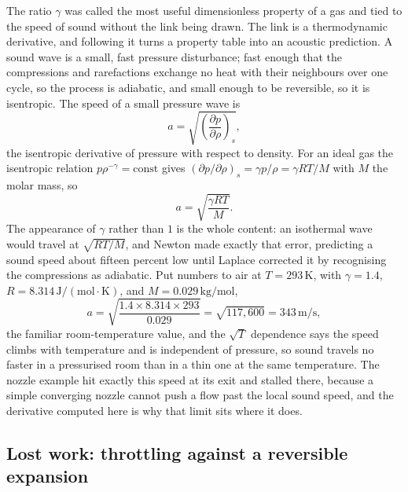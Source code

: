 The ratio $\gamma$ was called the most useful dimensionless property of a gas and
tied to the speed of sound without the link being drawn. The link is a
thermodynamic derivative, and following it turns a property table into an acoustic
prediction. A sound wave is a small, fast pressure disturbance; fast enough that
the compressions and rarefactions exchange no heat with their neighbours over one
cycle, so the process is adiabatic, and small enough to be reversible, so it is
isentropic. The speed of a small pressure wave is
\[
a = \sqrt{\left(\frac{\partial p}{\partial \rho}\right)_s},
\]
the isentropic derivative of pressure with respect to density. For an ideal gas the
isentropic relation $p\rho^{-\gamma} = \text{const}$ gives $(\partial p/\partial
\rho)_s = \gamma p/\rho = \gamma R T/M$ with $M$ the molar mass, so
\[
a = \sqrt{\frac{\gamma R T}{M}}.
\]
The appearance of $\gamma$ rather than $1$ is the whole content: an isothermal wave
would travel at $\sqrt{RT/M}$, and Newton made exactly that error, predicting a
sound speed about fifteen percent low until Laplace corrected it by recognising the
compressions as adiabatic. Put numbers to air at $T = 293\,\si{\kelvin}$, with
$\gamma = 1.4$, $R = 8.314\,\text{J}/(\text{mol}\cdot\si{\kelvin})$, and
$M = 0.029\,\text{kg}/\text{mol}$,
\[
a = \sqrt{\frac{1.4 \times 8.314 \times 293}{0.029}} = \sqrt{117{,}600} =
343\,\text{m}/\text{s},
\]
the familiar room-temperature value, and the $\sqrt{T}$ dependence says the speed
climbs with temperature and is independent of pressure, so sound travels no faster
in a pressurised room than in a thin one at the same temperature. The nozzle
example hit exactly this speed at its exit and stalled there, because a simple
converging nozzle cannot push a flow past the local sound speed, and the derivative
computed here is why that limit sits where it does.

\subsection{Lost work: throttling against a reversible expansion}

